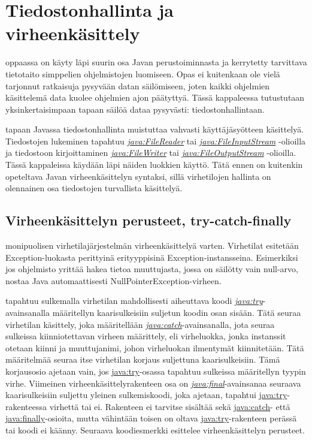 \documentclass{tufte-book}
\newcommand{\java}[1]{\underline{\gls{java:#1}}}
\newcommand{\newjava}[1]{\textit{\java{#1}}}
\begin{document}
\chapter{Tiedostonhallinta ja virheenkäsittely}
\label{tiedostoista}

 oppaassa on käyty läpi suurin osa Javan perustoiminnasta ja kerrytetty
tarvittava tietotaito simppelien ohjelmistojen luomiseen. Opas ei kuitenkaan ole vielä tarjonnut
ratkaisuja pysyvään datan säilömiseen, joten kaikki ohjelmien käsittelemä data kuolee ohjelmien
ajon päätyttyä. Tässä kappaleessa tutustutaan yksinkertaisimpaan tapaan säilöä dataa pysyvästi:
tiedostonhallintaan. 

 tapaan Javassa tiedostonhallinta muistuttaa vahvasti
käyttäjäsyötteen käsittelyä. Tiedostojen lukeminen tapahtuu \newjava{FileReader} tai
\newjava{FileInputStream} -olioilla ja tiedostoon kirjoittaminen \newjava{FileWriter} tai
\newjava{FileOutputStream} -olioilla. Tässä kappaleissa käydään läpi näiden luokkien käyttö. Tätä
ennen on kuitenkin opeteltava Javan virheenkäsittelyn syntaksi, sillä virhetilojen hallinta on
olennainen osa tiedostojen turvallista käsittelyä.


\section{Virheenkäsittelyn perusteet, try-catch-finally}
\label{try-catch}

 monipuolisen virhetilajärjestelmän virheenkäsittelyä varten. Virhetilat
esitetään Exception-luokasta perittyinä erityyppisinä Exception-instansseina. Esimerkiksi jos
ohjelmisto yrittää hakea tietoa muuttujasta, jossa on säilötty vain null-arvo, nostaa Java
automaattisesti NullPointerException-virheen. 

 tapahtuu sulkemalla virhetilan mahdollisesti aiheuttava koodi
\newjava{try}-avainsanalla määritellyn kaarisulkeisiin suljetun koodin osan sisään. Tätä seuraa
virhetilan käsittely, joka määritellään \newjava{catch}-avainsanalla, jota seuraa sulkeissa
kiinniotettavan virheen määrittely, eli virheluokka, jonka instanssit otetaan kiinni ja
muuttujanimi, johon virheluokan ilmentymät kiinnitetään. Tätä määritelmää seuraa itse virhetilan
korjaus suljettuna kaarisulkeisiin. Tämä korjausosio ajetaan vain, jos \java{try}-osassa tapahtuu
sulkeissa määritellyn tyypin virhe. Viimeinen virheenkäsittelyrakenteen osa on
\newjava{final}-avainsanaa seuraava kaarisulkeisiin suljettu yleinen sulkemiskoodi, joka ajetaan,
tapahtui \java{try}-rakenteessa virhettä tai ei. Rakenteen ei tarvitse sisältää sekä \java{catch}-
että \java{finally}-osioita, mutta vähintään toisen on oltava \java{try}-rakenteen perässä tai
koodi ei käänny. Seuraava koodiesmerkki esittelee virheenkäsittelyn perusteet.
\end{document}
